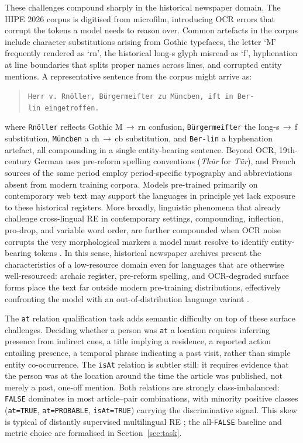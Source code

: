 \documentclass[
]{ceurart}
\theoremstyle{definition}
\begin{document}
These challenges compound sharply in the historical newspaper domain.
The HIPE 2026 corpus is digitised from microfilm, introducing OCR errors that corrupt the tokens a model needs to reason over.
Common artefacts in the corpus include character substitutions arising from Gothic typefaces, the letter `M' frequently rendered as `rn', the historical long-s glyph misread as `f', hyphenation at line boundaries that splits proper names across lines, and corrupted entity mentions.
A representative sentence from the corpus might arrive as:
\begin{quote}
\small\texttt{Herr v. Rnöller, Bürgermeifter zu Müncben, ift in Ber-\\
lin eingetroffen.}
\end{quote}
\noindent where \texttt{Rnöller} reflects Gothic M\,$\to$\,rn confusion, \texttt{Bürgermeifter} the long-s\,$\to$\,f substitution, \texttt{Müncben} a ch\,$\to$\,cb substitution, and \texttt{Ber-lin} a hyphenation artefact, all compounding in a single entity-bearing sentence.
Beyond OCR, 19th-century German uses pre-reform spelling conventions (\textit{Thür} for \textit{Tür}), and French sources of the same period employ period-specific typography and abbreviations absent from modern training corpora.
Models pre-trained primarily on contemporary web text may support the languages in principle yet lack exposure to these historical registers.
More broadly, linguistic phenomena that already challenge cross-lingual RE in contemporary settings, compounding, inflection, pro-drop, and variable word order, are further compounded when OCR noise corrupts the very morphological markers a model must resolve to identify entity-bearing tokens \citep{hennig2023multitacred}.
In this sense, historical newspaper archives present the characteristics of a low-resource domain even for languages that are otherwise well-resourced: archaic register, pre-reform spelling, and OCR-degraded surface forms place the text far outside modern pre-training distributions, effectively confronting the model with an out-of-distribution language variant \citep{ali2025multilingual,pakray2025natural}.

The \texttt{at} relation qualification task adds semantic difficulty on top of these surface challenges.
Deciding whether a person was \texttt{at} a location requires inferring presence from indirect cues, a title implying a residence, a reported action entailing presence, a temporal phrase indicating a past visit, rather than simple entity co-occurrence.
The \texttt{isAt} relation is subtler still: it requires evidence that the person was at the location around the time the article was published, not merely a past, one-off mention.
Both relations are strongly class-imbalanced: \texttt{FALSE} dominates in most article--pair combinations, with minority positive classes (\texttt{at=TRUE}, \texttt{at=PROBABLE}, \texttt{isAt=TRUE}) carrying the discriminative signal.
This skew is typical of distantly supervised multilingual RE \citep{cabot2023redfm,zhang-etal-2019-long,mintz-etal-2009-distant}; the all-\texttt{FALSE} baseline and metric choice are formalised in Section~\ref{sec:task}.
\end{document}
